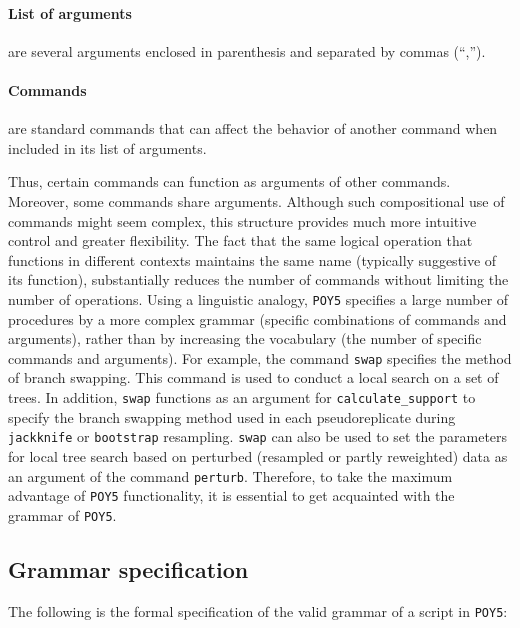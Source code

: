 \documentclass[11pt]{book}
\newcommand{\commandstyle}[1]{\texttt{#1}}
\newcommand{\poycommand}[1]{\commandstyle{#1}}
\newcommand{\poyargument}[1]{\commandstyle{#1}}
\newcommand{\poy}{\commandstyle{POY5}\xspace}
\begin{document}
\paragraph{List of arguments} are several arguments enclosed in parenthesis and
separated by commas (``,''). 

\paragraph{Commands} are standard commands that can affect the behavior of
another command when included in its list of arguments.

Thus, certain commands can function as arguments of other commands. Moreover,
some commands share arguments. Although such compositional use of commands
might seem complex, this structure provides much more intuitive
control and greater flexibility. The fact that the same logical operation that functions
in different contexts maintains
the same name (typically suggestive of its function), substantially reduces the number of
commands without limiting the number of operations. Using a linguistic analogy,
\poy specifies a large number of procedures by a more complex grammar (specific
combinations of commands and arguments), rather than by increasing the vocabulary
(the number of specific commands and arguments). For example, the command
\poycommand{swap} specifies the method of branch swapping. This command is
used to conduct a local search on a set of trees. In addition,
\poycommand{swap} functions as an argument for \poycommand{calculate\_support}
to specify the branch swapping method used in each pseudoreplicate during 
\poyargument{jackknife} or \poyargument{bootstrap} resampling. \poycommand{swap} 
can also be used to set the parameters for local tree search based on perturbed (resampled 
or partly reweighted) data as an argument of the command \poycommand{perturb}. 
Therefore, to take the maximum advantage of \poy functionality, it is essential to 
get acquainted with the grammar of  \poy.

\subsection{Grammar specification}

The following is the formal specification of the valid grammar of a script in \poy:
\end{document}
